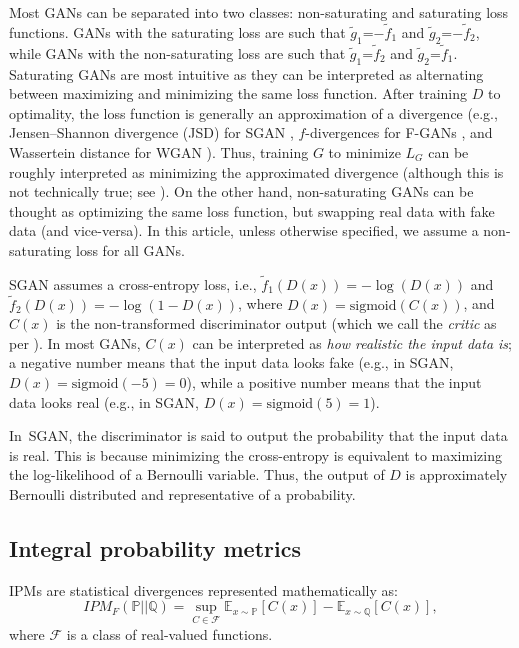 \documentclass{article}
\begin{document}
Most GANs can be separated into two classes: non-saturating and saturating loss functions. GANs with the saturating loss are such that $\tilde{g}_1$=$-\tilde{f}_1$ and $\tilde{g}_2$=$-\tilde{f}_2$, while GANs with the non-saturating loss are such that $\tilde{g}_1$=$\tilde{f}_2$ and $\tilde{g}_2$=$\tilde{f}_1$. Saturating GANs are most intuitive as they can be interpreted as alternating between maximizing and minimizing the same loss function. After training $D$ to optimality, the loss function is generally an approximation of a divergence (e.g., Jensen–Shannon divergence (JSD) for SGAN \citep{GAN}, $f$-divergences for F-GANs \citep{F-GAN}, and Wassertein distance for WGAN \citep{WGAN}). Thus, training $G$ to minimize $L_G$ can be roughly interpreted as minimizing the approximated divergence (although this is not technically true; see \citet{alexia2018beyonddivergence}). On the other hand, non-saturating GANs can be thought as optimizing the same loss function, but swapping real data with fake data (and vice-versa). In this article, unless otherwise specified, we assume a non-saturating loss for all GANs.

SGAN assumes a cross-entropy loss, i.e., $\tilde{f}_1(D(x))=-\log(D(x))$ and $\tilde{f}_2(D(x))=-\log(1-D(x))$, where $D(x)=\text{sigmoid}(C(x))$, and $C(x)$ is the non-transformed discriminator output (which we call the \textit{critic} as per \citet{WGAN}). In most GANs, $C(x)$ can be interpreted as \textit{how realistic the input data is}; a negative number means that the input data looks fake (e.g., in SGAN, $D(x)=\text{sigmoid}(-5)=0$), while a positive number means that the input data looks real (e.g., in SGAN, $D(x)=\text{sigmoid}(5)=1$).

In SGAN, the discriminator is said to output the probability that the input data is real. This is because minimizing the cross-entropy is equivalent to maximizing the log-likelihood of a Bernoulli variable. Thus, the output of $D$ is approximately Bernoulli distributed and representative of a probability.

\subsection{Integral probability metrics}

IPMs are statistical divergences represented mathematically as:
\[
IPM_{F} (\mathbb{P} || \mathbb{Q}) = \sup_{C \in \mathcal{F}} \mathbb{E}_{x \sim \mathbb{P}}[C(x)] - \mathbb{E}_{x \sim \mathbb{Q}}[C(x)],
\]
where $\mathcal{F}$ is a class of real-valued functions. 
\end{document}
